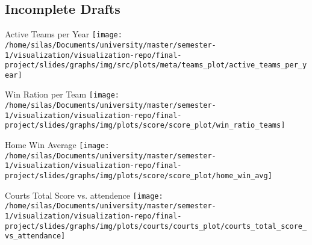 \documentclass[pdf]{beamer}
\begin{document}
    \subsection{Incomplete Drafts}
    \begin{frame}{Active Teams per Year}
        \centering
        \texttt{[image: /home/silas/Documents/university/master/semester-1/visualization/visualization-repo/final-project/slides/graphs/img/src/plots/meta/teams\_plot/active\_teams\_per\_year]}
    \end{frame}
    \begin{frame}{Win Ration per Team}
        \centering
        \texttt{[image: /home/silas/Documents/university/master/semester-1/visualization/visualization-repo/final-project/slides/graphs/img/plots/score/score\_plot/win\_ratio\_teams]}
    \end{frame}
    \begin{frame}{Home Win Average}
        \centering
        \texttt{[image: /home/silas/Documents/university/master/semester-1/visualization/visualization-repo/final-project/slides/graphs/img/plots/score/score\_plot/home\_win\_avg]}
    \end{frame}
    \begin{frame}{Courts Total Score vs. attendence}
        \centering
        \texttt{[image: /home/silas/Documents/university/master/semester-1/visualization/visualization-repo/final-project/slides/graphs/img/plots/courts/courts\_plot/courts\_total\_score\_vs\_attendance]}
    \end{frame}
\end{document}
